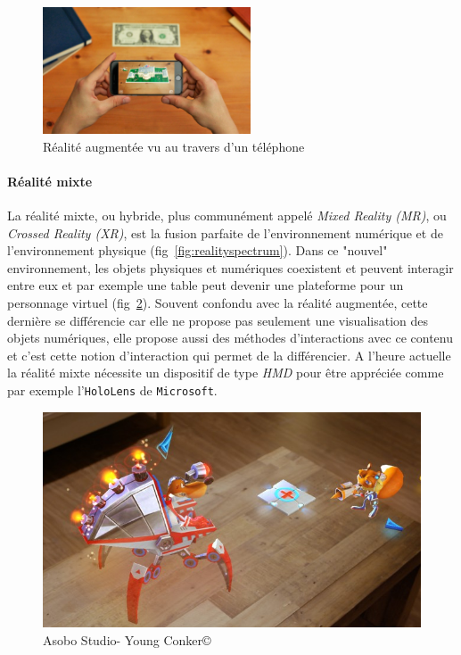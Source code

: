 \begin{figure}[H]
\centering
\includegraphics[width=0.55\textwidth]{images/AR}
\caption{Réalité augmentée vu au travers d'un téléphone\protect\footnotemark}\label{fig:AR}
\end{figure}

\paragraph{Réalité mixte}
La réalité mixte, ou hybride, plus communément appelé \emph{Mixed Reality (MR)}, ou \emph{Crossed Reality (XR)}, est la fusion parfaite de l'environnement numérique et de l'environnement physique (fig~\ref{fig:realityspectrum}). Dans ce "nouvel" environnement, les objets physiques et numériques coexistent et peuvent interagir entre eux et par exemple une table peut devenir une plateforme pour un personnage virtuel (fig~\ref{fig:youngconker}). Souvent confondu avec la réalité augmentée, cette dernière se différencie car elle ne propose pas seulement une visualisation des objets numériques, elle propose aussi des méthodes d'interactions avec ce contenu et c'est cette notion d'interaction qui permet de la différencier. A l'heure actuelle la réalité mixte nécessite un dispositif de type \emph{HMD} pour être appréciée comme par exemple  l'\texttt{HoloLens} de \texttt{Microsoft}.

\begin{figure}[H]
\centering
\includegraphics[scale=0.4]{images/youngconker}
\caption{Asobo Studio\texttrademark - Young Conker\copyright}
\label{fig:youngconker}
\end{figure}

